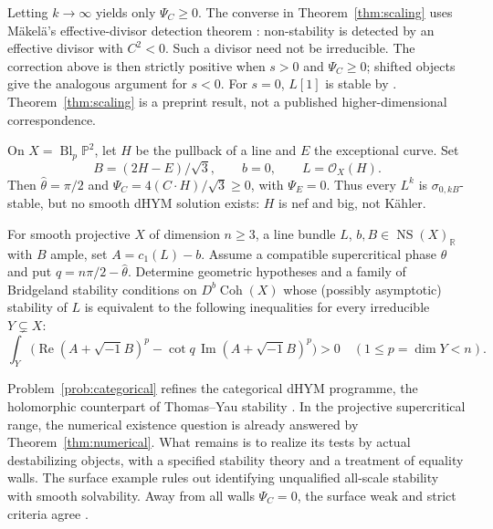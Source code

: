 \documentclass[12pt,reqno]{amsart}
\newcommand{\ii}{\sqrt{-1}}
\newcommand{\R}{\mathbb R}
\newcommand{\NS}{\operatorname{NS}}
\newcommand{\Coh}{\operatorname{Coh}}
\newcommand{\Rea}{\operatorname{Re}}
\newcommand{\Ima}{\operatorname{Im}}
\begin{document}
Letting $k\to\infty$ yields only $\Psi_C\ge0$.
The converse in Theorem~\ref{thm:scaling} uses M\"akel\"a's effective-divisor detection theorem \cite[Theorem 1.1, Corollary 1.5]{Makela}: non-stability is detected by an effective divisor with $C^2<0$. Such a divisor need not be irreducible. The correction above is then strictly positive when $s>0$ and $\Psi_C\ge0$; shifted objects give the analogous argument for $s<0$.
For $s=0$, $L[1]$ is stable by \cite[Corollary 7.2]{Makela}.
Theorem~\ref{thm:scaling} is a preprint result, not a published higher-dimensional correspondence.

\begin{example}\label{ex:wall}
On $X=\operatorname{Bl}_p\mathbb P^2$, let $H$ be the pullback of a line and $E$ the exceptional curve. Set
\[
 B=(2H-E)/\sqrt3,\qquad b=0,\qquad L=\mathcal O_X(H).
\]
Then $\widehat\theta=\pi/2$ and
$\Psi_C=4(C\cdot H)/\sqrt3\ge0$, with $\Psi_E=0$.
Thus every $L^k$ is $\sigma_{0,kB}$-stable, but no smooth dHYM solution exists: $H$ is nef and big, not K\"ahler.
\end{example}

\begin{problem}\label{prob:categorical}
For smooth projective $X$ of dimension $n\ge3$, a line bundle $L$,
$b,B\in\NS(X)_\R$ with $B$ ample, set $A=c_1(L)-b$.
Assume a compatible supercritical phase $\widehat\theta$ and put
$q=n\pi/2-\widehat\theta$.
Determine geometric hypotheses and a family of Bridgeland stability conditions on $D^b\Coh(X)$ whose (possibly asymptotic) stability of $L$ is equivalent to the following inequalities for every irreducible $Y\subsetneq X$:
\[
 \int_Y\bigl(\Rea(A+\ii B)^p-\cot q\,\Ima(A+\ii B)^p\bigr)>0
 \quad(1\le p=\dim Y<n).
\]
\end{problem}

Problem~\ref{prob:categorical} refines the categorical dHYM programme, the holomorphic counterpart of Thomas--Yau stability \cite[Conjectures 1.2--1.3]{CS}. In the projective supercritical range, the numerical existence question is already answered by Theorem~\ref{thm:numerical}. What remains is to realize its tests by actual destabilizing objects, with a specified stability theory and a treatment of equality walls. The surface example rules out identifying unqualified all-scale stability with smooth solvability. Away from all walls $\Psi_C=0$, the surface weak and strict criteria agree \cite{Fan,Makela}.



\end{document}
